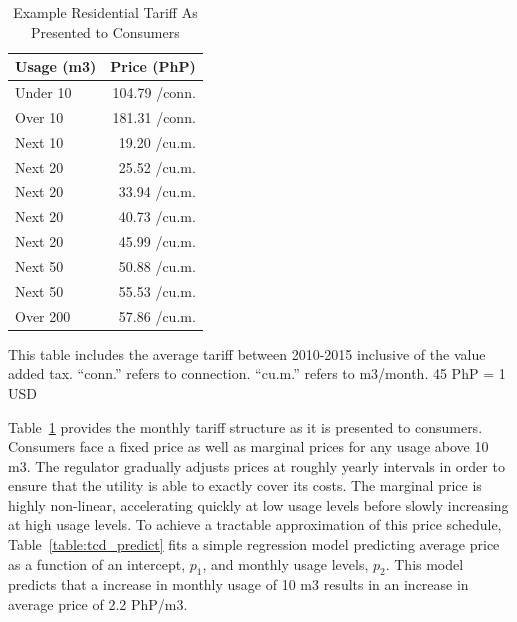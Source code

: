\documentclass[12pt]{article}
\begin{document}
\begin{table}
\centering
\caption{Example Residential Tariff As Presented to Consumers}\label{table:tarifftrue}
\begin{threeparttable}
\begin{tabular}{l*{1}{r}}
\toprule
Usage (m3) & Price (PhP) \\
\midrule
Under   10    &   104.79 /conn. \\
Over    10    &   181.31 /conn. \\
Next    10    &   19.20 /cu.m. \\
Next    20    &   25.52 /cu.m. \\
Next    20    &   33.94 /cu.m. \\
Next    20    &   40.73 /cu.m. \\
Next    20    &   45.99 /cu.m. \\
Next    50    &   50.88 /cu.m. \\
Next    50    &   55.53 /cu.m. \\
Over   200    &   57.86 /cu.m. \\
\bottomrule
\end{tabular}
\begin{tablenotes}
\item 
\footnotesize
This table includes the average tariff between 2010-2015 inclusive of the value added tax. ``conn.'' refers to connection. ``cu.m.'' refers to m3/month.   45 PhP = 1 USD
\end{tablenotes}
\end{threeparttable}
\end{table}

Table~\ref{table:tarifftrue} provides the monthly tariff structure as it is presented to consumers.  Consumers face a fixed price as well as marginal prices for any usage above 10 m3.  The regulator gradually adjusts prices at roughly yearly intervals in order to ensure that the utility is able to exactly cover its costs.  The marginal price is highly non-linear, accelerating quickly at low usage levels before slowly increasing at high usage levels.  To achieve a tractable approximation of this price schedule, Table~\ref{table:tcd_predict} fits a simple regression model predicting average price as a function of an intercept, $p_1$, and monthly usage levels, $p_2$.  This model predicts that a increase in monthly usage of 10 m3 results in an increase in average price of 2.2 PhP/m3.  
\end{document}
